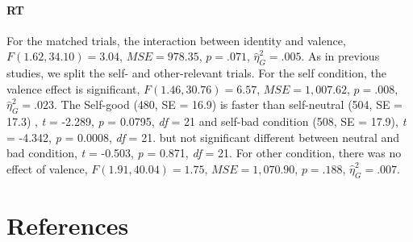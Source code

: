 \documentclass[
  english,
  man]{apa6}
\let\oldparagraph\paragraph
\renewcommand{\paragraph}[1]{\oldparagraph{#1}\mbox{}}
\begin{document}
\hypertarget{rt-1}{%
\paragraph{RT}\label{rt-1}}

For the matched trials, the interaction between identity and valence, \(F(1.62, 34.10) = 3.04\), \(\mathit{MSE} = 978.35\), \(p = .071\), \(\hat{\eta}^2_G = .005\). As in previous studies, we split the self- and other-relevant trials. For the self condition, the valence effect is significant, \(F(1.46, 30.76) = 6.57\), \(\mathit{MSE} = 1,007.62\), \(p = .008\), \(\hat{\eta}^2_G = .023\). The Self-good (480, SE = 16.9) is faster than self-neutral (504, SE = 17.3) , \emph{t} = -2.289, \emph{p} = 0.0795, \emph{df} = 21 and self-bad condition (508, SE = 17.9), \emph{t} = -4.342, \emph{p} = 0.0008, \emph{df} = 21. but not significant different between neutral and bad condition, \emph{t} = -0.503, \emph{p} = 0.871, \emph{df} = 21. For other condition, there was no effect of valence, \(F(1.91, 40.04) = 1.75\), \(\mathit{MSE} = 1,070.90\), \(p = .188\), \(\hat{\eta}^2_G = .007\).

\newpage

\hypertarget{references}{%
\section{References}\label{references}}

\begingroup
\setlength{\parindent}{-0.5in}
\setlength{\leftskip}{0.5in}

\hypertarget{refs}{}

\endgroup
\end{document}
